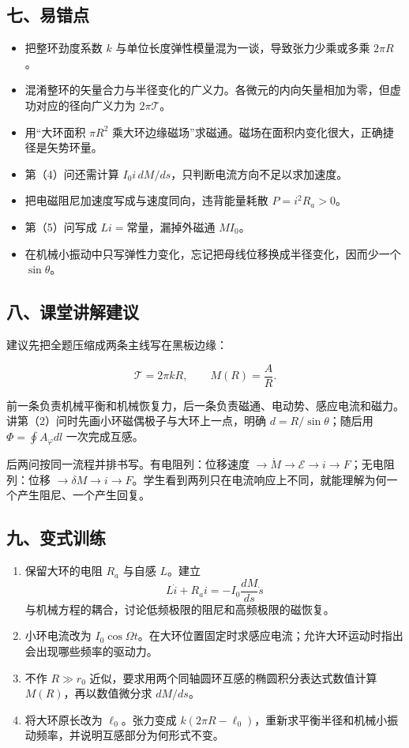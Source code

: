 \documentclass[12pt,a4paper,UTF8]{ctexart}
\newcommand{\tightlist}{\setlength{\itemsep}{0pt}\setlength{\parskip}{0pt}}
\begin{document}
\subsection{七、易错点}\label{ux4e03ux6613ux9519ux70b9-4}

\begin{itemize}
\tightlist
\item
  把整环劲度系数 \(k\) 与单位长度弹性模量混为一谈，导致张力少乘或多乘
  \(2\pi R\)。
\item
  混淆整环的矢量合力与半径变化的广义力。各微元的内向矢量相加为零，但虚功对应的径向广义力为
  \(2\pi\mathcal T\)。
\item
  用``大环面积 \(\pi R^2\)
  乘大环边缘磁场''求磁通。磁场在面积内变化很大，正确捷径是矢势环量。
\item
  第（4）问还需计算 \(I_0i\,dM/ds\)，只判断电流方向不足以求加速度。
\item
  把电磁阻尼加速度写成与速度同向，违背能量耗散 \(P=i^2R_a>0\)。
\item
  第（5）问写成 \(Li=\text{常量}\)，漏掉外磁通 \(MI_0\)。
\item
  在机械小振动中只写弹性力变化，忘记把母线位移换成半径变化，因而少一个
  \(\sin\theta\)。
\end{itemize}

\subsection{八、课堂讲解建议}\label{ux516bux8bfeux5802ux8bb2ux89e3ux5efaux8bae-4}

建议先把全题压缩成两条主线写在黑板边缘：

\[\mathcal T=2\pi kR,\qquad M(R)=\frac AR.\]

前一条负责机械平衡和机械恢复力，后一条负责磁通、电动势、感应电流和磁力。讲第（2）问时先画小环磁偶极子与大环上一点，明确
\(d=R/\sin\theta\)；随后用 \(\Phi=\oint A_\varphi dl\) 一次完成互感。

后两问按同一流程并排书写。有电阻列：位移速度
\(\to\dot M\to\mathcal E\to i\to F\)；无电阻列：位移
\(\to\delta M\to i\to F\)。学生看到两列只在电流响应上不同，就能理解为何一个产生阻尼、一个产生回复。

\subsection{九、变式训练}\label{ux4e5dux53d8ux5f0fux8badux7ec3-4}

\begin{enumerate}
\def\labelenumi{\arabic{enumi}.}
\tightlist
\item
  保留大环的电阻 \(R_a\) 与自感 \(L\)。建立
  \[L\dot i+R_ai=-I_0\frac{dM}{ds}\dot s\]
  与机械方程的耦合，讨论低频极限的阻尼和高频极限的磁恢复。
\item
  小环电流改为
  \(I_0\cos\Omega t\)。在大环位置固定时求感应电流；允许大环运动时指出会出现哪些频率的驱动力。
\item
  不作 \(R\gg r_0\) 近似，要求用两个同轴圆环互感的椭圆积分表达式数值计算
  \(M(R)\)，再以数值微分求 \(dM/ds\)。
\item
  将大环原长改为 \(\ell_0\)。张力变成
  \(k(2\pi R-\ell_0)\)，重新求平衡半径和机械小振动频率，并说明互感部分为何形式不变。
\end{enumerate}
\end{document}
